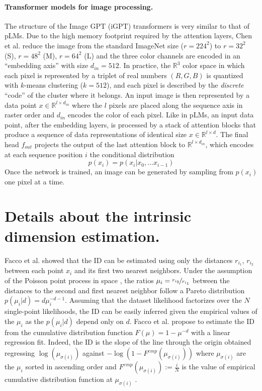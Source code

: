 \documentclass{article}
\begin{document}
\paragraph{Transformer models for image processing.}\label{app:img}
The structure of the Image GPT (iGPT) transformers is very similar to that of pLMs. 
%
Due to the high memory footprint required by the attention layers, Chen et al. \cite{igpt} reduce the image from the standard ImageNet size ($r = 224^2$) to $r = 32^2$ (S), $r = 48^2$ (M), $r = 64^2$ (L) 
and the three color channels are encoded in an ``embedding axis'' with size $d_{in} = 512$. 
%
In practice, the $\mathbb{R}^3$ color space in which each pixel is represented by a triplet of real numbers $(R, G, B)$ is quantized with $k$-means clustering ($k=512$), and each pixel is described by the \emph{discrete} ``code''  of the cluster where it belongs.
%
An input image is then represented by a data point $x \in \mathbb{R}^{l\times d_{in}}$ where the $l$ pixels are placed along the sequence axis in raster order and $d_{in}$ encodes the color of each pixel.
%
Like in pLMs, an input data point, after the embedding layers, is processed by a stack of attention blocks that produce a sequence of data representations of identical size $x \in \mathbb{R}^{l \times d}$. 
%
The final head $f_{out}$ projects the output of the last attention block to $\mathbb{R}^{l \times d_{in}}$, which encodes at each sequence position $i$ the conditional distribution 
\begin{equation}
    p(x_i) = p(x_i|x_0, ... x_{i-1})
\end{equation}
%
Once the network is trained, an image can be generated by sampling from $p(x_i)$ one pixel at a time.

\clearpage

\section{Details about the intrinsic dimension estimation.}
\label{sec:app_twonn_details}
Facco et al. \cite{facco2017id} showed that the ID can be estimated using only the distances $r_{i_1}$, $r_{i_2}$ between each point $x_i$ and its first two nearest neighbors.
%
Under the assumption of the Poisson point process in space \cite{poisson_process}, the ratios $\mu_i = \nicefrac{r_{i_2}}{r_{i_1}}$ between the distances to the second and first nearest neighbor follow a Pareto distribution $p(\mu_i|d) = d\mu_i^{-d-1}$. 
Assuming that the dataset likelihood factorizes over the $N$ single-point likelihoods, the ID can be easily inferred given the empirical values of the $\mu_i$ as the $p(\mu_i|d)$ depend only on $d$. 
%
Facco et al. propose to estimate the ID from the cumulative distribution function $F(\mu) = 1 - \mu^{-d}$  with a linear regression fit. Indeed, the ID is the slope of the line through the origin obtained regressing $\log(\mu_{\sigma(i)})$ against $- \log(1 - F^{emp}(\mu_{\sigma(i)}))$ where $\mu_{\sigma(i)}$ are the $\mu_i$ sorted in ascending order and $F^{emp}(\mu_{\sigma(i)}):= \frac{i}{N}$ is the value of empirical cumulative distribution function at $\mu_{\sigma(i)}$ \cite{facco2017id}. 
%
\end{document}
